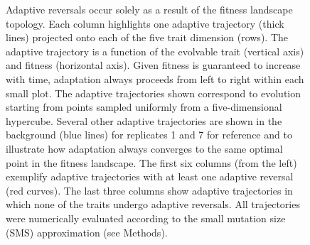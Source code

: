 \documentclass[dvips,12pt,twoside,titlepage]{article}
\begin{document}
\begin{figure}[p]
\begin{center}
\caption{Adaptive reversals occur solely as a result of the fitness landscape topology.
Each column highlights one adaptive trajectory (thick lines) projected onto each of the five trait dimension (rows).
The adaptive trajectory is a function of the evolvable trait (vertical axis) and fitness (horizontal axis). 
Given fitness is guaranteed to increase with time, adaptation always proceeds from left to right within each small plot.
The adaptive trajectories shown correspond to evolution starting from points sampled uniformly from a five-dimensional hypercube. Several other adaptive trajectories are shown in the background (blue lines) for replicates 1 and 7 for reference and to illustrate how adaptation always converges to the same optimal point in the fitness landscape.
The first six columns (from the left) exemplify adaptive trajectories with at least one adaptive reversal (red curves).
The last three columns show adaptive trajectories in which none of the traits undergo adaptive reversals.
All trajectories were numerically evaluated according to the small mutation size (SMS) approximation (see Methods).}
\label{Traces}
\end{center}
\end{figure}
\clearpage
\end{document}
